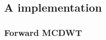     \hypertarget{a-implementation}{%
\subsection{A implementation}\label{a-implementation}}

\hypertarget{forward-mcdwt}{%
\subsubsection{Forward MCDWT}\label{forward-mcdwt}}

\begin{Shaded}
\begin{Highlighting}[]
\OperatorTok{=}  
\OperatorTok{=}  


\end{Highlighting}
\end{Shaded}
